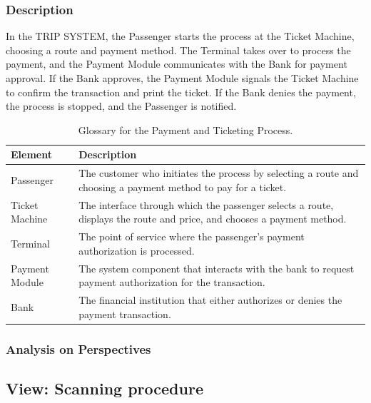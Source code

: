 \subsubsection{Description}
In the TRIP SYSTEM, the Passenger starts the process at the Ticket Machine, choosing a route and payment method. The Terminal takes over to process the payment, and the Payment Module communicates with the Bank for payment approval. If the Bank approves, the Payment Module signals the Ticket Machine to confirm the transaction and print the ticket. If the Bank denies the payment, the process is stopped, and the Passenger is notified.

\begin{table}[H]
    \centering
    \caption{Glossary for the Payment and Ticketing Process.}
    \label{tab:payment_ticketing_glossary}
    \begin{tabularx}{\textwidth}{@{}lX@{}} %
    \toprule
    \textbf{Element} & \textbf{Description} \\
    \midrule
    Passenger & The customer who initiates the process by selecting a route and choosing a payment method to pay for a ticket. \\
    Ticket Machine & The interface through which the passenger selects a route, displays the route and price, and chooses a payment method. \\
    Terminal & The point of service where the passenger's payment authorization is processed. \\
    Payment Module & The system component that interacts with the bank to request payment authorization for the transaction. \\
    Bank & The financial institution that either authorizes or denies the payment transaction. \\
    \bottomrule
    \end{tabularx}
\end{table}

\subsubsection{Analysis on Perspectives}
\subsection{View: Scanning procedure}
